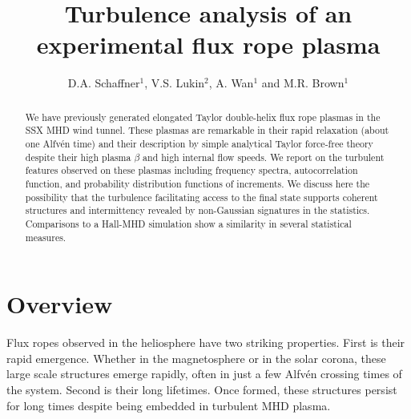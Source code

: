 \documentclass[12pt]{iopart}
\begin{document}
\title{Turbulence analysis of an experimental flux rope plasma}

\author{D.A. Schaffner$^{1}$, V.S. Lukin$^{2}$, A. Wan$^{1}$ and M.R. Brown$^{1}$}

\address{$^{1}$ Swarthmore College, Swarthmore, PA, USA}
\address{$^{2}$ Naval Research Laboratory, Washington, DC, USA}
\begin{abstract}
We have previously generated elongated Taylor double-helix flux rope plasmas in the SSX MHD wind tunnel.  These plasmas are remarkable in their rapid relaxation (about one Alfv\'en time) and their description by simple analytical Taylor force-free theory despite their high plasma $\beta$ and high internal flow speeds. We report on the turbulent features observed on these plasmas including frequency spectra, autocorrelation function, and probability distribution functions of increments.  We discuss here the possibility that the turbulence facilitating access to the final state supports coherent structures and intermittency revealed by non-Gaussian signatures in the statistics.  Comparisons to a Hall-MHD simulation show a similarity in several statistical measures.
\end{abstract}



\maketitle

\section{Overview}

Flux ropes observed in the heliosphere have two striking properties.   First is their rapid emergence.  Whether in the magnetosphere or in the solar corona, these large scale structures emerge rapidly, often in just a few Alfv\'en crossing times of the system.  Second is their long lifetimes.  Once formed, these structures persist for long times despite being embedded in turbulent MHD plasma.  
\end{document}
